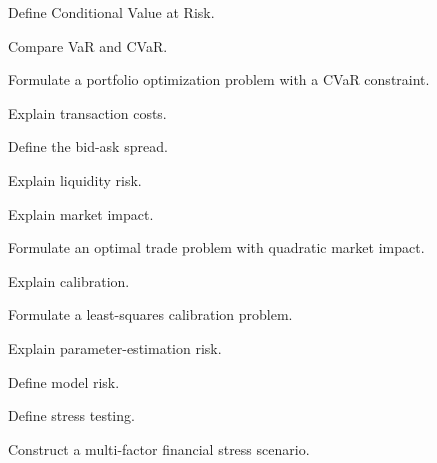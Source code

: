 \begin{exercise}[2]
Define Conditional Value at Risk.
\end{exercise}

\begin{exercise}[3]
Compare VaR and CVaR.
\end{exercise}

\begin{exercise}[3]
Formulate a portfolio optimization problem with a CVaR constraint.
\end{exercise}

\begin{exercise}[2]
Explain transaction costs.
\end{exercise}

\begin{exercise}[2]
Define the bid-ask spread.
\end{exercise}

\begin{exercise}[2]
Explain liquidity risk.
\end{exercise}

\begin{exercise}[3]
Explain market impact.
\end{exercise}

\begin{exercise}[3]
Formulate an optimal trade problem with quadratic market impact.
\end{exercise}

\begin{exercise}[2]
Explain calibration.
\end{exercise}

\begin{exercise}[3]
Formulate a least-squares calibration problem.
\end{exercise}

\begin{exercise}[3]
Explain parameter-estimation risk.
\end{exercise}

\begin{exercise}[2]
Define model risk.
\end{exercise}

\begin{exercise}[2]
Define stress testing.
\end{exercise}

\begin{exercise}[3]
Construct a multi-factor financial stress scenario.
\end{exercise}

